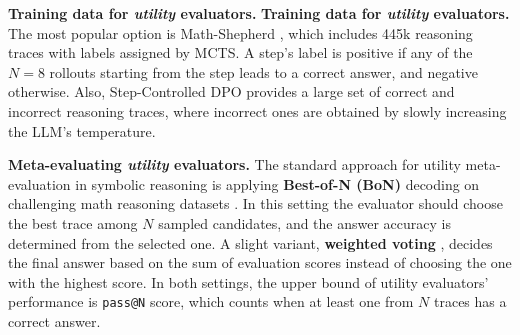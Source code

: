 \textbf{Training data for \textit{utility} evaluators.} \textbf{Training data for \textit{utility} evaluators.} The most popular option is Math-Shepherd \citep{wang-etal-2024-math}, which includes 445k reasoning traces with labels assigned by MCTS. A step's label is positive if any of the $N=8$ rollouts starting from the step leads to a correct answer, and negative otherwise. Also, Step-Controlled DPO \citep{lu2024stepcontrolleddpoleveragingstepwise} provides a large set of correct and incorrect reasoning traces, where incorrect ones are obtained by slowly increasing the LLM's temperature.

\textbf{Meta-evaluating \textit{utility} evaluators.} The standard approach for utility meta-evaluation in symbolic reasoning is applying \textbf{Best-of-N (BoN)} decoding on challenging math reasoning datasets \citep{wang-etal-2024-math, cui2024ultrafeedbackboostinglanguagemodels, zhang2025lessonsdevelopingprocessreward}. In this setting the evaluator should choose the best trace among $N$ sampled candidates, and the answer accuracy is determined from the selected one. A slight variant, \textbf{weighted voting} \citep{yuan2024freeprocessrewardsprocess}, decides the final answer based on the sum of evaluation scores instead of choosing the one with the highest score. In both settings, the upper bound of utility evaluators' performance is \texttt{pass@N} score, which counts when at least one from $N$ traces has a correct answer.
